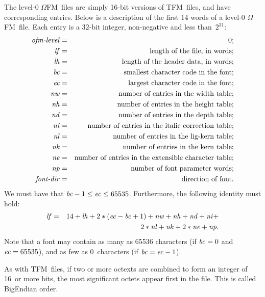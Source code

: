 \documentclass[fleqn]{article}
\newcommand{\OMEGA}{$\Omega$}
\newcommand{\myit}[1]{\mbox{\emph{#1}}}
\newcommand{\OFM}{\OMEGA FM}
\newcommand{\TFM}{TFM}
\begin{document}
The level-0 \OFM\ files are simply 16-bit versions of \TFM\ files, and have
corresponding entries.
Below is a description of the first 14 words of a level-0 \OFM\ file.
Each entry is a 32-bit integer, non-negative and less than~$2^{31}$:
\begin{eqnarray*}
\myit{ofm-level} & = & 0; \\
\myit{lf} & = & \mbox{length of the file, in words}; \\
\myit{lh} & = & \mbox{length of the header data, in words}; \\
\myit{bc} & = & \mbox{smallest character code in the font}; \\
\myit{ec} & = & \mbox{largest character code in the font}; \\
\myit{nw} & = & \mbox{number of entries in the width table}; \\
\myit{nh} & = & \mbox{number of entries in the height table}; \\
\myit{nd} & = & \mbox{number of entries in the depth table}; \\
\myit{ni} & = & \mbox{number of entries in the italic correction table}; \\
\myit{nl} & = & \mbox{number of entries in the lig-kern table}; \\
\myit{nk} & = & \mbox{number of entries in the kern table}; \\
\myit{ne} & = & \mbox{number of entries in the extensible character table}; \\
\myit{np} & = & \mbox{number of font parameter words}; \\
\myit{font-dir} & = & \mbox{direction of font}.
\end{eqnarray*}
We must have that $\myit{bc}-1\leq \myit{ec}\leq 65535$.
Furthermore, the following identity must hold:
\begin{eqnarray*}
\myit{lf} & = &
14 + \myit{lh} + 2*(\myit{ec}-\myit{bc}+1) +
\myit{nw} + \myit{nh} + \myit{nd} + \myit{ni} +\\
& & 2*\myit{nl} + \myit{nk} + 2*\myit{ne} + \myit{np}.
\end{eqnarray*}
Note that a font may contain as many as 65536 characters (if $\myit{bc}=0$
and $\myit{ec}=65535$), and as few as 0~characters
(if $\myit{bc}=\myit{ec}-1$).

As with \TFM\ files, if two or more octexts are combined to form an integer
of 16~or more bits, the most significant octets appear first in the file.
This is called BigEndian order.
\end{document}
